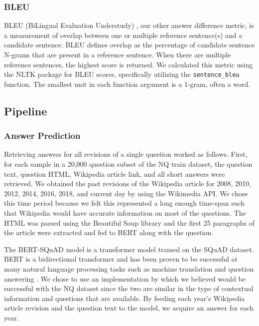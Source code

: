 \documentclass{article}
\begin{document}
\subsubsection{BLEU}
\label{bleumetric}


BLEU (BiLingual Evaluation Understudy) \cite{bleu}, our other answer difference
metric, is a measurement of overlap between one or multiple reference
sentence(s) and a candidate sentence. BLEU defines overlap as the percentage of
candidate sentence N-grams that are present in a reference sentence. When there
are multiple reference sentences, the highest score is returned. We calculated
this metric using the NLTK \cite{nltk} package for BLEU scores, specifically
utilizing the {\tt sentence\_bleu} function. The smallest unit in each function
argument is a 1-gram, often a word.


\subsection{Pipeline}
\label{pipeline}


\subsubsection{Answer Prediction}
Retrieving answers for all revisions of a single question worked as follows.
First, for each sample in a 20,000 question subset of the NQ train dataset, the
question text, question HTML, Wikipedia article link, and all short answers were
retrieved. We obtained the past revisions of the Wikipedia article for 2008,
2010, 2012, 2014, 2016, 2018, and current day by using the Wikimedia API. We
chose this time period because we felt this represented a long enough time-span
such that Wikipedia would have accurate information on most of the questions.
The HTML was parsed using the Beautiful Soup library and the first 25 paragraphs
of the article were extracted and fed to BERT along with the question.

The BERT-SQuAD model is a transformer model trained on the SQuAD dataset. BERT
is a bidirectional transformer and has been proven to be successful at many
natural language processing tasks such as machine translation and question
answering \cite{bert}. We chose to use an implementation by \cite{bertsquad}
which we believed would be successful with the NQ dataset since the two are
similar in the type of contextual information and questions that are available.
By feeding each year’s Wikipedia article revision and the question text to the
model, we acquire an answer for each year.
\end{document}
